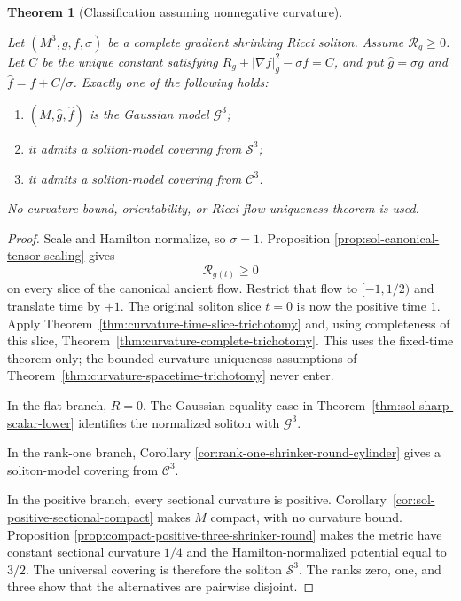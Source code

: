 \documentclass[10pt]{coll-l}
\newtheorem{theorem}{Theorem}[chapter]
\theoremstyle{definition}
\theoremstyle{remark}
\numberwithin{section}{chapter}
\numberwithin{equation}{chapter}
\begin{document}
\begin{theorem}[Classification assuming nonnegative curvature]
\label{thm:nonnegative-three-shrinker-classification}
\leavevmode\par\noindent
Let $(M^3,g,f,\sigma)$ be a complete gradient shrinking Ricci soliton.
Assume $\mathcal R_g\geq0$.  Let $C$ be the unique constant satisfying
$R_g+|\nabla f|_g^2-\sigma f=C$, and put
$\widehat g=\sigma g$ and $\widehat f=f+C/\sigma$.  Exactly one of the
following holds:
\begin{enumerate}
\item $(M,\widehat g,\widehat f)$ is the Gaussian model $\mathcal G^3$;
\item it admits a soliton-model covering from $\mathcal S^3$;
\item it admits a soliton-model covering from $\mathcal C^3$.
\end{enumerate}
No curvature bound, orientability, or Ricci-flow uniqueness theorem is
used.
\end{theorem}

\begin{proof}
Scale and Hamilton normalize, so $\sigma=1$.  Proposition
\ref{prop:sol-canonical-tensor-scaling} gives
\[
                  \mathcal R_{g(t)}\geq0
\]
on every slice of the canonical ancient flow.  Restrict
that flow to $[-1,1/2)$ and translate time by $+1$.  The original soliton
slice $t=0$ is now the positive time $1$.  Apply
Theorem~\ref{thm:curvature-time-slice-trichotomy} and, using completeness
of this slice, Theorem~\ref{thm:curvature-complete-trichotomy}.  This uses
the fixed-time theorem only; the bounded-curvature uniqueness assumptions
of Theorem~\ref{thm:curvature-spacetime-trichotomy} never enter.

In the flat branch, $R=0$.  The Gaussian equality case in
Theorem~\ref{thm:sol-sharp-scalar-lower} identifies the normalized soliton
with $\mathcal G^3$.

In the rank-one branch, Corollary
\ref{cor:rank-one-shrinker-round-cylinder} gives a soliton-model covering
from $\mathcal C^3$.

In the positive branch, every sectional curvature is positive.
Corollary~\ref{cor:sol-positive-sectional-compact} makes $M$ compact, with
no curvature bound.  Proposition
\ref{prop:compact-positive-three-shrinker-round} makes the metric have
constant sectional curvature $1/4$ and the Hamilton-normalized potential
equal to $3/2$.  The universal covering is therefore the soliton
$\mathcal S^3$.  The ranks zero, one, and three show that the alternatives
are pairwise disjoint.
\end{proof}
\end{document}

